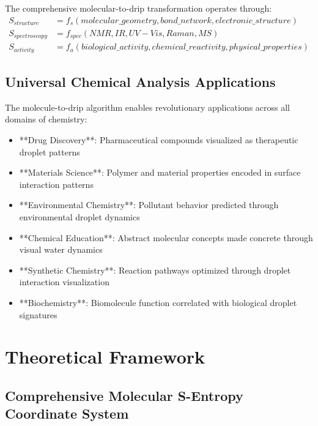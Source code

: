 \documentclass[12pt,a4paper]{article}
\begin{document}
The comprehensive molecular-to-drip transformation operates through:
\begin{align}
S_{structure} &= f_s(molecular\_geometry, bond\_network, electronic\_structure) \\
S_{spectroscopy} &= f_{spec}(NMR, IR, UV-Vis, Raman, MS) \\
S_{activity} &= f_a(biological\_activity, chemical\_reactivity, physical\_properties)
\end{align}

\subsection{Universal Chemical Analysis Applications}

The molecule-to-drip algorithm enables revolutionary applications across all domains of chemistry:

\begin{itemize}
\item **Drug Discovery**: Pharmaceutical compounds visualized as therapeutic droplet patterns
\item **Materials Science**: Polymer and material properties encoded in surface interaction patterns
\item **Environmental Chemistry**: Pollutant behavior predicted through environmental droplet dynamics
\item **Chemical Education**: Abstract molecular concepts made concrete through visual water dynamics
\item **Synthetic Chemistry**: Reaction pathways optimized through droplet interaction visualization
\item **Biochemistry**: Biomolecule function correlated with biological droplet signatures
\end{itemize}

\section{Theoretical Framework}

\subsection{Comprehensive Molecular S-Entropy Coordinate System}
\end{document}

